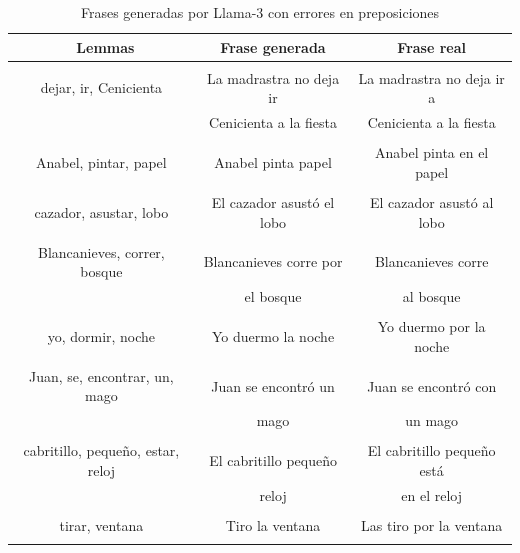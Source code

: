 \documentclass[11pt,spanish,listoffigures,listoftables]{tfgetsinf}
\begin{document}
\begin{table}[!h]
\caption{Frases generadas por Llama-3 con errores en preposiciones}
\begin{center}
\begin{tabular}{ c | c | c }
	\ Lemmas & Frase generada & Frase real \\
	\hline
	\hline
	 & & \\
	dejar, ir, Cenicienta & La madrastra no deja ir & La madrastra no deja ir a \\
	 & Cenicienta a la fiesta & Cenicienta a la fiesta \\
	 & & \\
	Anabel, pintar, papel & Anabel pinta papel & Anabel pinta en el papel \\
	 & & \\
	cazador, asustar, lobo & El cazador asustó el lobo & El cazador asustó al lobo \\
	 & & \\
	Blancanieves, correr, bosque & Blancanieves corre por  & Blancanieves corre \\
	 & el bosque & al bosque \\
	 & & \\
	yo, dormir, noche & Yo duermo la noche & Yo duermo por la noche \\
	 & & \\
	Juan, se, encontrar, un, mago & Juan se encontró un  & Juan se encontró con \\
	 & mago & un mago \\
	 & & \\
	cabritillo, pequeño, estar, reloj & El cabritillo pequeño   & El cabritillo pequeño está  \\
	 & reloj & en el reloj \\
	 & & \\
	tirar, ventana & Tiro la ventana & Las tiro por la ventana \\
	 & & \\

\end{tabular}
\end{center}
\label{tab:erroresPreposicion}
\end{table}
\end{document}
